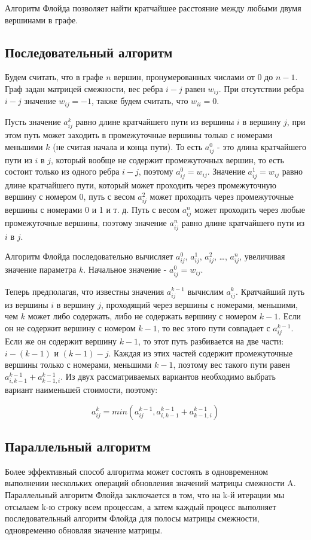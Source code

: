 Алгоритм Флойда \cite{alg} позволяет найти кратчайшее расстояние между любыми двумя вершинами в графе.

\subsection{Последовательный алгоритм}

Будем считать, что в графе $n$ вершин, пронумерованных числами от $0$ до $n - 1$. Граф задан матрицей смежности, вес ребра $i - j$ равен $w_{ij}$. При отсутствии ребра $i - j$ значение $w_{ij} = -1$, также будем считать, что $w_{ii} = 0$.

Пусть значение $a^k_{ij}$ равно длине кратчайшего пути из вершины $i$ в вершину $j$, при этом путь может заходить в промежуточные вершины только с номерами меньшими $k$ (не считая начала и конца пути). То есть $a^0_{ij}$ - это длина кратчайшего пути из $i$ в $j$, который вообще не содержит промежуточных вершин, то есть состоит только из одного ребра $i - j$, поэтому $a^0_{ij} = w_{ij}$. Значение $a^1_{ij} = w_{ij}$ равно длине кратчайшего пути, который может проходить через промежуточную вершину с номером 0, путь с весом $a^2_{ij}$ может проходить через промежуточные вершины с номерами 0 и 1 и т. д. Путь с весом $a^n_{ij}$ может проходить через любые промежуточные вершины, поэтому значение $a^n_{ij}$ равно длине кратчайшего пути из $i$ в $j$.

Алгоритм Флойда последовательно вычисляет $a^0_{ij}$, $a^1_{ij}$, $a^2_{ij}$, …, $a^n_{ij}$, увеличивая значение параметра $k$. Начальное значение - $a^0_{ij} = w_{ij}$.

Теперь предполагая, что известны значения $a^{k - 1}_{ij}$ вычислим $a^k_{ij}$. Кратчайший путь из вершины $i$ в вершину $j$, проходящий через вершины с номерами, меньшими, чем $k$ может либо содержать, либо не содержать вершину с номером $k - 1$. Если он не содержит вершину с номером $k - 1$, то вес этого пути совпадает с $a^{k - 1}_{ij}$. Если же он содержит вершину $k - 1$, то этот путь разбивается на две части: $i - (k - 1)$ и $(k - 1) - j$. Каждая из этих частей содержит промежуточные вершины только с номерами, меньшими $k - 1$, поэтому вес такого пути равен $a^{k - 1}_{i,k-1} + a^{k - 1}_{k-1,i}$. Из двух рассматриваемых вариантов необходимо выбрать вариант наименьшей стоимости, поэтому:

\begin{equation}
	a^k_{ij} = min(a^{k - 1}_{ij}, a^{k - 1}_{i,k-1} + a^{k - 1}_{k-1,i})
\end{equation}

\subsection{Параллельный алгоритм}

Более эффективный способ алгоритма может состоять в одновременном выполнении нескольких операций обновления значений матрицы смежности A. Параллельный алгоритм Флойда заключается в том, что на k-й итерации мы отсылаем k-ю строку всем процессам, а затем каждый процесс выполняет последовательный алгоритм Флойда для полосы матрицы смежности, одновременно обновляя значение матрицы.

